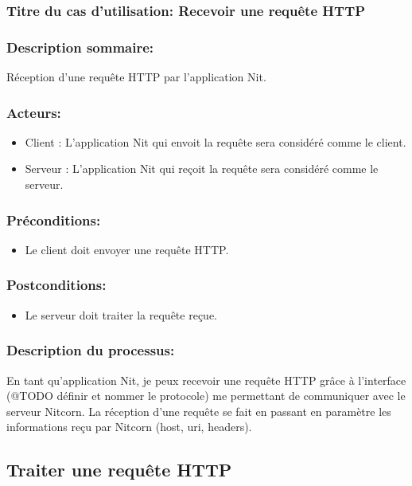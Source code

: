 \documentclass{scrreprt}
\begin{document}
\subsubsection{Titre du cas d'utilisation: Recevoir une requête HTTP}

\subsubsection{Description sommaire:}
Réception d'une requête HTTP par l'application Nit.

\subsubsection{Acteurs:}
\begin{itemize}
	\item Client : L'application Nit qui envoit la requête sera considéré comme le client.
    	\item Serveur : L'application Nit qui reçoit la requête sera considéré comme le serveur.
\end{itemize}

\subsubsection{Préconditions:}
\begin{itemize}
    \item  Le client doit envoyer une requête HTTP.
\end{itemize} 

\subsubsection{Postconditions:}
\begin{itemize}
    \item Le serveur doit traiter la requête reçue.
\end{itemize} 

\subsubsection{Description du processus:}
En tant qu'application Nit, je peux recevoir une requête HTTP grâce à l'interface
(@TODO définir et nommer le protocole) me permettant de communiquer avec le serveur
Nitcorn. La réception d'une requête se fait en passant en paramètre les informations
reçu par Nitcorn (host, uri, headers).

\subsection{Traiter une requête HTTP}
\end{document}
